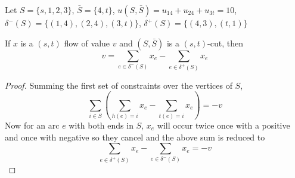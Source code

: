                 \begin{example}
                    \begin{figure}[H]
                        \centering
                    \end{figure}

                    Let $S = \{s, 1, 2, 3\}$, $\bar{S} = \{4, t\}$, $u(S, \bar{S}) = u_{14} + u_{24} + u_{3t} = 10$, $\delta^-(S) = \{(1, 4), (2, 4), (3, t)\}$, $\delta^+(S) = \{(4, 3), (t, 1)\}$
                \end{example}

                \begin{lemma}
                    If $x$ is a $(s, t)$ flow of value $v$ and $(S, \bar{S})$ is a $(s, t)$-cut, then
                    \begin{equation*}
                        v = \sum_{e\in \delta^-(S)} x_e - \sum_{e\in \delta^+(S)} x_e
                    \end{equation*}
                \end{lemma}

                \begin{proof}
                    Summing the first set of constraints over the vertices of $S$,
                    \begin{equation*}
                        \sum_{i\in S} (\sum_{h(e) = i}x_e - \sum_{t(e) = i}x_e) = -v
                    \end{equation*}
                    Now for an arc $e$ with both ends in $S$, $x_e$ will occur twice once with a positive and once with negative so they cancel and the above sum is reduced to
                    \begin{equation*}
                        \sum_{e\in \delta^+(S)}x_e - \sum_{e \in \delta^-(S)}x_e = -v
                    \end{equation*}
                \end{proof}

